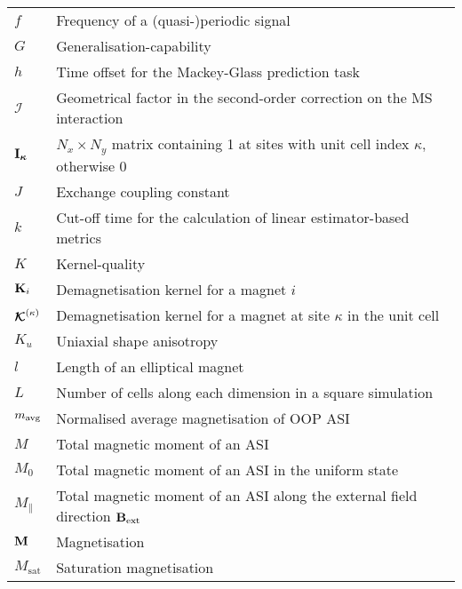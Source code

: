 \begin{longtable}[l]{p{60pt} p{350pt}}
	$f$ & Frequency of a (quasi-)periodic signal\vspace{\whiteline}\\

	$G$ & Generalisation-capability\vspace{\whiteline}\\

	$h$ & Time offset for the Mackey-Glass prediction task\vspace{\whiteline}\\

	$\mathcal{I}$ & Geometrical factor in the second-order correction on the MS interaction \\
	$\boldsymbol{\mathbf{I_\kappa}}$ & $N_x \times N_y$ matrix containing 1 at sites with unit cell index $\kappa$, otherwise 0\vspace{\whiteline}\\

	$J$ & Exchange coupling constant\vspace{\whiteline}\\

	$k$ & Cut-off time for the calculation of linear estimator-based metrics \\
	$K$ & Kernel-quality \\ %
	$\boldsymbol{\mathbf{K}}_i$ & Demagnetisation kernel for a magnet $i$ \\
	$\boldsymbol{\mathbf{\mathcal{K}}}^{(\kappa)}$ & Demagnetisation kernel for a magnet at site $\kappa$ in the unit cell \\
	$K_u$ & Uniaxial shape anisotropy\vspace{\whiteline}\\

	$l$ & Length of an elliptical magnet \\
	$L$ & Number of cells along each dimension in a square simulation\vspace{\whiteline}\\

	$m_\mathrm{avg}$ & Normalised average magnetisation of OOP ASI \\
	$M$ & Total magnetic moment of an ASI \\
	$M_0$ & Total magnetic moment of an ASI in the uniform state \\
	$M_\parallel$ & Total magnetic moment of an ASI along the external field direction $\boldsymbol{\mathbf{B}}_\mathrm{ext}$ \\
	$\boldsymbol{\mathbf{M}}$ & Magnetisation \\
	$M_\mathrm{sat}$ & Saturation magnetisation\vspace{\whiteline}\\


\end{longtable}
